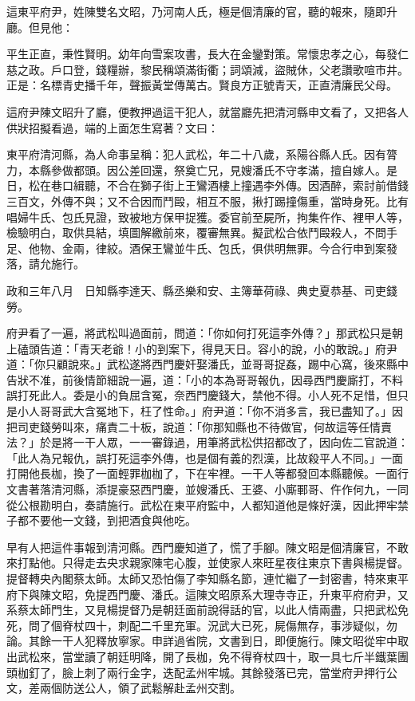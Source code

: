 \begin{showcontents}{}
這東平府尹，姓陳雙名文昭，乃河南人氏，極是個清廉的官，聽的報來，隨即升廳。但見他：

平生正直，秉性賢明。幼年向雪案攻書，長大在金鑾對策。常懷忠孝之心，每發仁慈之政。戶口登，錢糧辦，黎民稱頌滿街衢；詞頌減，盜賊休，父老讚歌喧市井。正是：名標青史播千年，聲振黃堂傳萬古。賢良方正號青天，正直清廉民父母。

這府尹陳文昭升了廳，便教押過這干犯人，就當廳先把清河縣申文看了，又把各人供狀招擬看過，端的上面怎生寫著？文曰：

東平府清河縣，為人命事呈稱：犯人武松，年二十八歲，系陽谷縣人氏。因有膂力，本縣參做都頭。因公差回還，祭奠亡兄，見嫂潘氏不守孝滿，擅自嫁人。是日，松在巷口緝聽，不合在獅子街上王鸞酒樓上撞遇李外傳。因酒醉，索討前借錢三百文，外傳不與；又不合因而鬥毆，相互不服，揪打踢撞傷重，當時身死。比有唱婦牛氏、包氏見證，致被地方保甲捉獲。委官前至屍所，拘集仵作、裡甲人等，檢驗明白，取供具結，填圖解繳前來，覆審無異。擬武松合依鬥毆殺人，不問手足、他物、金兩，律絞。酒保王鸞並牛氏、包氏，俱供明無罪。今合行申到案發落，請允施行。

政和三年八月　日知縣李達天、縣丞樂和安、主簿華荷祿、典史夏恭基、司吏錢勞。

府尹看了一遍，將武松叫過面前，問道：「你如何打死這李外傳？」那武松只是朝上磕頭告道：「青天老爺！小的到案下，得見天日。容小的說，小的敢說。」府尹道：「你只顧說來。」武松遂將西門慶奸娶潘氏，並哥哥捉姦，踢中心窩，後來縣中告狀不准，前後情節細說一遍，道：「小的本為哥哥報仇，因尋西門慶廝打，不料誤打死此人。委是小的負屈含冤，奈西門慶錢大，禁他不得。小人死不足惜，但只是小人哥哥武大含冤地下，枉了性命。」府尹道：「你不消多言，我已盡知了。」因把司吏錢勞叫來，痛責二十板，說道：「你那知縣也不待做官，何故這等任情賣法？」於是將一干人眾，一一審錄過，用筆將武松供招都改了，因向佐二官說道：「此人為兄報仇，誤打死這李外傳，也是個有義的烈漢，比故殺平人不同。」一面打開他長枷，換了一面輕罪枷枷了，下在牢裡。一干人等都發回本縣聽候。一面行文書著落清河縣，添提豪惡西門慶，並嫂潘氏、王婆、小廝鄆哥、仵作何九，一同從公根勘明白，奏請施行。武松在東平府監中，人都知道他是條好漢，因此押牢禁子都不要他一文錢，到把酒食與他吃。

早有人把這件事報到清河縣。西門慶知道了，慌了手腳。陳文昭是個清廉官，不敢來打點他。只得走去央求親家陳宅心腹，並使家人來旺星夜往東京下書與楊提督。提督轉央內閣蔡太師。太師又恐怕傷了李知縣名節，連忙繼了一封密書，特來東平府下與陳文昭，免提西門慶、潘氏。這陳文昭原系大理寺寺正，升東平府府尹，又系蔡太師門生，又見楊提督乃是朝廷面前說得話的官，以此人情兩盡，只把武松免死，問了個脊杖四十，刺配二千里充軍。況武大已死，屍傷無存，事涉疑似，勿論。其餘一干人犯釋放寧家。申詳過省院，文書到日，即便施行。陳文昭從牢中取出武松來，當堂讀了朝廷明降，開了長枷，免不得脊杖四十，取一具七斤半鐵葉團頭枷釘了，臉上刺了兩行金字，迭配孟州牢城。其餘發落已完，當堂府尹押行公文，差兩個防送公人，領了武鬆解赴孟州交割。


\end{showcontents}
